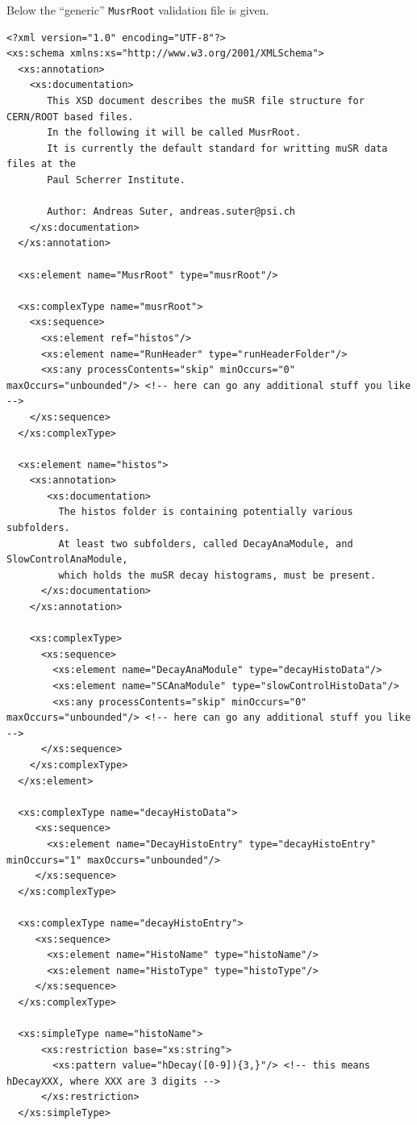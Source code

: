 \documentclass[twoside]{article}
\newcommand{\musrroot}{\texttt{MusrRoot}\xspace}
\begin{document}
Below the ``generic'' \musrroot validation file is given.
\begin{shaded}
\begin{small}
\begin{verbatim}
<?xml version="1.0" encoding="UTF-8"?>
<xs:schema xmlns:xs="http://www.w3.org/2001/XMLSchema"> 
  <xs:annotation>
    <xs:documentation>
       This XSD document describes the muSR file structure for CERN/ROOT based files.
       In the following it will be called MusrRoot.
       It is currently the default standard for writting muSR data files at the 
       Paul Scherrer Institute.
          
       Author: Andreas Suter, andreas.suter@psi.ch          
    </xs:documentation>
  </xs:annotation>
    
  <xs:element name="MusrRoot" type="musrRoot"/>
  
  <xs:complexType name="musrRoot">
    <xs:sequence>
      <xs:element ref="histos"/>
      <xs:element name="RunHeader" type="runHeaderFolder"/>
      <xs:any processContents="skip" minOccurs="0" maxOccurs="unbounded"/> <!-- here can go any additional stuff you like -->
    </xs:sequence>  
  </xs:complexType>
    
  <xs:element name="histos">
    <xs:annotation>
       <xs:documentation>
         The histos folder is containing potentially various subfolders. 
         At least two subfolders, called DecayAnaModule, and SlowControlAnaModule,
         which holds the muSR decay histograms, must be present.
      </xs:documentation>
    </xs:annotation>
      
    <xs:complexType>
      <xs:sequence>
        <xs:element name="DecayAnaModule" type="decayHistoData"/>
        <xs:element name="SCAnaModule" type="slowControlHistoData"/>
        <xs:any processContents="skip" minOccurs="0" maxOccurs="unbounded"/> <!-- here can go any additional stuff you like -->
      </xs:sequence>
    </xs:complexType>
  </xs:element>
       
  <xs:complexType name="decayHistoData">
     <xs:sequence>
       <xs:element name="DecayHistoEntry" type="decayHistoEntry" minOccurs="1" maxOccurs="unbounded"/>
     </xs:sequence> 
  </xs:complexType>
    
  <xs:complexType name="decayHistoEntry">
     <xs:sequence>
       <xs:element name="HistoName" type="histoName"/>
       <xs:element name="HistoType" type="histoType"/>  
     </xs:sequence>      
  </xs:complexType>
    
  <xs:simpleType name="histoName">
      <xs:restriction base="xs:string">
        <xs:pattern value="hDecay([0-9]){3,}"/> <!-- this means hDecayXXX, where XXX are 3 digits -->
      </xs:restriction>
  </xs:simpleType>  
    

\end{verbatim}
\end{small}
\end{shaded}
\end{document}
